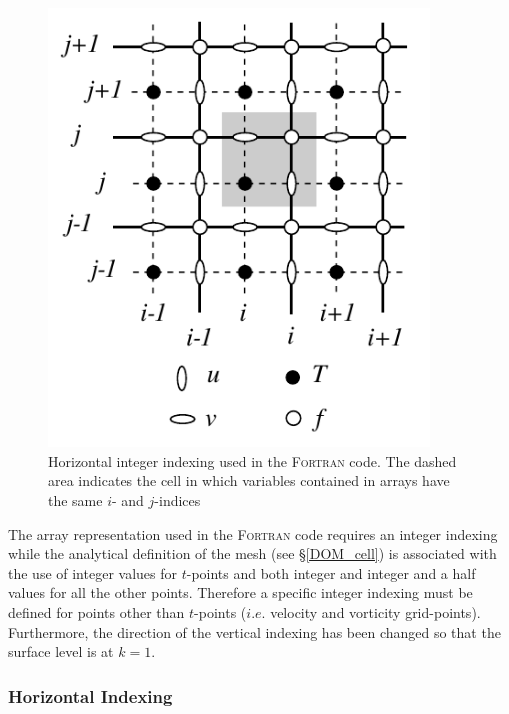 \begin{figure}[!tb]  \begin{center}
\includegraphics[width=0.90\textwidth]{./TexFiles/Figures/Fig_index_hor.pdf}
\caption{   \label{Fig_index_hor}    
Horizontal integer indexing used in the \textsc{Fortran} code. The dashed area indicates 
the cell in which variables contained in arrays have the same $i$- and $j$-indices}
\end{center}   \end{figure}

The array representation used in the \textsc{Fortran} code requires an integer 
indexing while the analytical definition of the mesh (see \S\ref{DOM_cell}) is 
associated with the use of integer values for $t$-points and both integer and 
integer and a half values for all the other points. Therefore a specific integer 
indexing must be defined for points other than $t$-points ($i.e.$ velocity and 
vorticity grid-points). Furthermore, the direction of the vertical indexing has 
been changed so that the surface level is at $k=1$.

\subsubsection{Horizontal Indexing}
\label{DOM_Num_Index_hor}

